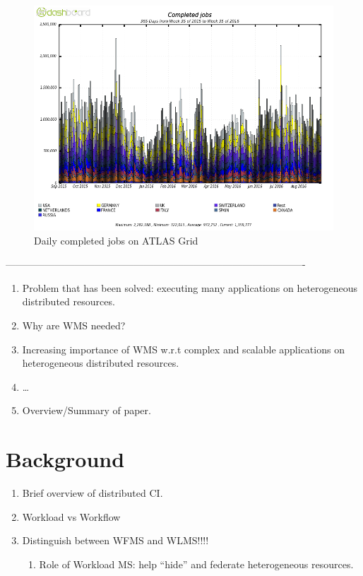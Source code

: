 \documentclass[10pt, conference, compsocconf]{IEEEtran}
\begin{document}
\begin{figure}
\begin{center}
\includegraphics[width=\columnwidth]{figures/DailyJobs.png}
\caption{Daily completed jobs on ATLAS Grid\label{fig:daily}}
\end{center}
\end{figure}

-------------------------------------------------------------------------------------------
\begin{enumerate}
  \item Problem that has been solved: executing many applications on heterogeneous distributed resources.
  \item Why are WMS needed?
  \item Increasing importance of WMS w.r.t complex and scalable applications on heterogeneous distributed resources.
  \item \ldots
  \item Overview/Summary of paper.
\end{enumerate}

\section{Background}
\label{sec:background}

\begin{enumerate}
  \item Brief overview of distributed CI.
  \item Workload vs Workflow
  \item Distinguish between WFMS and WLMS!!!!
  \begin{enumerate}
    \item Role of Workload MS: help “hide” and federate heterogeneous resources.
  \end{enumerate}
\end{enumerate}
\end{document}

